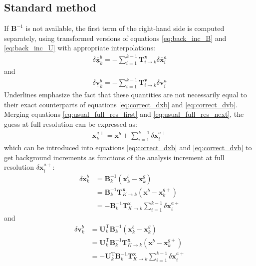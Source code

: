 \documentclass[12pt]{scrartcl}
\begin{document}
\subsection{Standard method}
If $\mathbf{B}^{-1}$ is not available, the first term of the right-hand side is computed separately, using transformed versions of equations \eqref{eq:back_inc_B} and \eqref{eq:back_inc_U} with appropriate interpolations:
\begin{align}
\label{eq:back_inc_Bvar}
\boxed{\delta \underline{\overline{\mathbf{x}}}^b_k = - \sum_{i=1}^{k-1} \mathbf{T}^\mathbf{x}_{i \rightarrow k} \delta \overline{\mathbf{x}}^a_i}
\end{align}
and 
\begin{align}
\label{eq:back_inc_Uvar}
\boxed{\delta \underline{\mathbf{v}}^b_k = - \sum_{i=1}^{k-1} \mathbf{T}^\mathbf{v}_{i \rightarrow k} \delta \mathbf{v}^a_i}
\end{align}
Underlines emphasize the fact that these quantities are not necessarily equal to their exact counterparts of equations \eqref{eq:correct_dxb} and \eqref{eq:correct_dvb}.\\
$  $\\
Merging equations \eqref{eq:usual_full_res_first} and \eqref{eq:usual_full_res_next}, the guess at full resolution can be expressed as:
\begin{align}
\label{eq:usual_full_res}
\mathbf{x}^{g+}_k = \mathbf{x}^{b} + \sum_{i=1}^{k-1} \delta \mathbf{x}^{a+}_i
\end{align}
which can be introduced into equations \eqref{eq:correct_dxb} and \eqref{eq:correct_dvb} to get background increments as functions of the analysis increment at full resolution $\delta \mathbf{x}^{a+}_i$:
\begin{align}
\label{eq:correct_dxb_2}
\delta \overline{\mathbf{x}}^b_k & = \mathbf{B}^{-1}_k \left(\mathbf{x}^b_k - \mathbf{x}^g_k\right) \nonumber \\
& = \mathbf{B}^{-1}_k \mathbf{T}^\mathbf{x}_{K \rightarrow k} \left(\mathbf{x}^b - \mathbf{x}^{g+}_k\right) \nonumber \\
& = -\mathbf{B}^{-1}_k \mathbf{T}^\mathbf{x}_{K \rightarrow k} \sum_{i=1}^{k-1} \delta \mathbf{x}^{a+}_i
\end{align}
and
\begin{align}
\label{eq:correct_dvb_2}
\delta \mathbf{v}^b_k & = \mathbf{U}_k^\mathrm{T} \mathbf{B}^{-1}_k \left(\mathbf{x}^b_k - \mathbf{x}^g_k\right) \nonumber \\
& = \mathbf{U}_k^\mathrm{T} \mathbf{B}^{-1}_k \mathbf{T}^\mathbf{x}_{K \rightarrow k} \left(\mathbf{x}^b - \mathbf{x}^{g+}_k\right) \nonumber \\
& = -\mathbf{U}_k^\mathrm{T} \mathbf{B}^{-1}_k \mathbf{T}^\mathbf{x}_{K \rightarrow k} \sum_{i=1}^{k-1} \delta \mathbf{x}^{a+}_i
\end{align}
\end{document}
